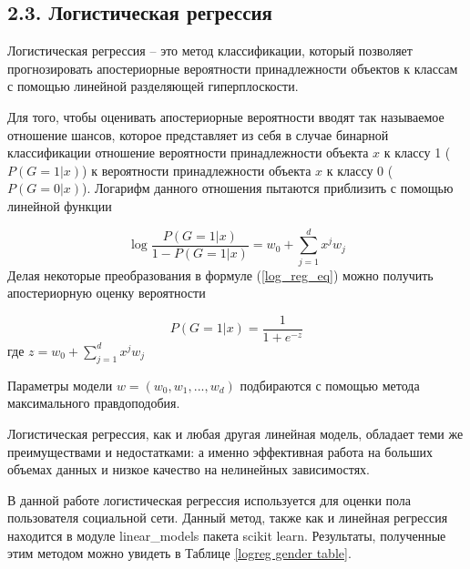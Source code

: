 \subsection{2.3. Логистическая регрессия}
Логистическая регрессия \cite{ESLII} -- это метод классификации, который позволяет прогнозировать апостериорные вероятности принадлежности объектов к классам с помощью линейной разделяющей гиперплоскости. 

Для того, чтобы оценивать апостериорные вероятности вводят так называемое отношение шансов, которое представляет из себя в случае бинарной классификации отношение вероятности принадлежности объекта $x$ к классу 1 ($P(G=1|x)$) к вероятности принадлежности объекта $x$ к классу 0 ($P(G=0|x)$). Логарифм данного отношения пытаются приблизить с помощью линейной функции

\begin{equation}\label{log_reg_eq}
\log \frac{P(G=1|x)}{1 - P(G=1|x)} = w_0 + \sum_{j=1}^{d}x^j w_j
\end{equation}
Делая некоторые преобразования в формуле  (\ref{log_reg_eq}) можно получить апостериорную оценку вероятности

$$P(G=1|x) = \frac{1}{1 + e^{-z}}$$
где $z = w_0 + \sum_{j=1}^{d}x^j w_j$

Параметры модели $w = (w_0, w_1, ... ,w_d)$ подбираются с помощью метода максимального правдоподобия.

Логистическая регрессия, как и любая другая линейная модель, обладает теми же преимуществами и недостатками: а именно эффективная работа на больших объемах данных и низкое качество на нелинейных зависимостях. 

В данной работе логистическая регрессия используется для оценки пола пользователя социальной сети. Данный метод, также как и линейная регрессия находится в модуле linear\_models пакета scikit learn.  Результаты, полученные этим методом можно увидеть в Таблице \ref{logreg gender table}.

